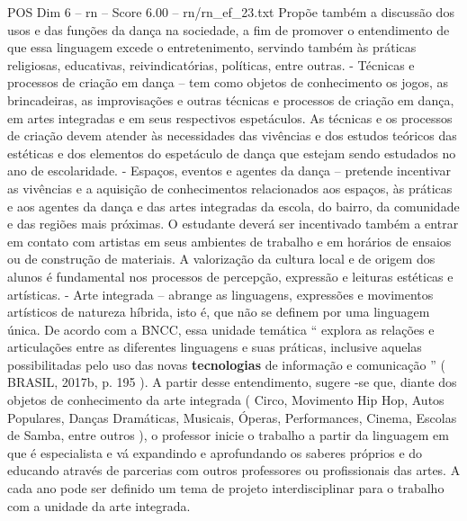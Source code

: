 \begin{textsample}{POS Dim 6 – rn – Score 6.00 – rn/rn\_ef\_23.txt}
Propõe também a discussão dos usos e das funções da dança na sociedade, a fim de promover o entendimento de que essa linguagem excede o entretenimento, servindo também às práticas religiosas, educativas, reivindicatórias, políticas, entre outras. - Técnicas e processos de criação em dança – tem como objetos de conhecimento os jogos, as brincadeiras, as improvisações e outras técnicas e processos de criação em dança, em artes integradas e em seus respectivos espetáculos.
As técnicas e os processos de criação devem atender às necessidades das vivências e dos estudos teóricos das estéticas e dos elementos do espetáculo de dança que estejam sendo estudados no ano de escolaridade. - Espaços, eventos e agentes da dança – pretende incentivar as vivências e a aquisição de conhecimentos relacionados aos espaços, às práticas e aos agentes da dança e das artes integradas da escola, do bairro, da comunidade e das regiões mais próximas.
O estudante deverá ser incentivado também a entrar em contato com artistas em seus ambientes de trabalho e em horários de ensaios ou de construção de materiais.
A valorização da cultura local e de origem dos alunos é fundamental nos processos de percepção, expressão e leituras estéticas e artísticas. - Arte integrada – abrange as linguagens, expressões e movimentos artísticos de natureza híbrida, isto é, que não se definem por uma linguagem única.
De acordo com a BNCC, essa unidade temática “ explora as relações e articulações entre as diferentes linguagens e suas práticas, inclusive aquelas possibilitadas pelo uso das novas \textbf{tecnologias} de informação e comunicação ” ( BRASIL, 2017b, p. 195 ).
A partir desse entendimento, sugere -se que, diante dos objetos de conhecimento da arte integrada ( Circo, Movimento Hip Hop, Autos Populares, Danças Dramáticas, Musicais, Óperas, Performances, Cinema, Escolas de Samba, entre outros ), o professor inicie o trabalho a partir da linguagem em que é especialista e vá expandindo e aprofundando os saberes próprios e do educando através de parcerias com outros professores ou profissionais das artes.
A cada ano pode ser definido um tema de projeto interdisciplinar para o trabalho com a unidade da arte integrada.

\end{textsample}
